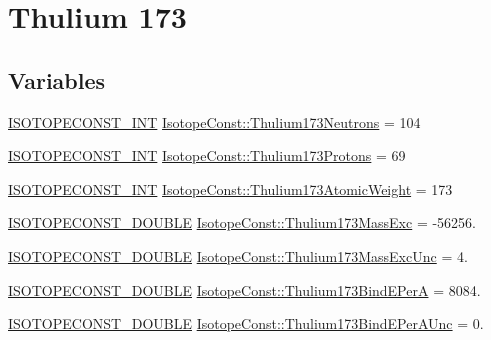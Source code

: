 \hypertarget{group___isotope_const-_thulium-_tm173}{}\section{Thulium 173}
\label{group___isotope_const-_thulium-_tm173}
\subsection*{Variables}
\begin{DoxyCompactItemize}
\item 
\mbox{\hyperlink{group___isotope_const-_macros_ga5f18360b3e99483a35c32d789e62621c}{I\+S\+O\+T\+O\+P\+E\+C\+O\+N\+S\+T\+\_\+\+I\+NT}} \mbox{\hyperlink{group___isotope_const-_thulium-_tm173_gaefd79f502e4828ecd6bbb4e08291b512}{Isotope\+Const\+::\+Thulium173\+Neutrons}} = 104
\item 
\mbox{\hyperlink{group___isotope_const-_macros_ga5f18360b3e99483a35c32d789e62621c}{I\+S\+O\+T\+O\+P\+E\+C\+O\+N\+S\+T\+\_\+\+I\+NT}} \mbox{\hyperlink{group___isotope_const-_thulium-_tm173_gab4f5866e05c2508376317e7c01800d8a}{Isotope\+Const\+::\+Thulium173\+Protons}} = 69
\item 
\mbox{\hyperlink{group___isotope_const-_macros_ga5f18360b3e99483a35c32d789e62621c}{I\+S\+O\+T\+O\+P\+E\+C\+O\+N\+S\+T\+\_\+\+I\+NT}} \mbox{\hyperlink{group___isotope_const-_thulium-_tm173_ga4da13be2ccf48c1957ec394f1b19045e}{Isotope\+Const\+::\+Thulium173\+Atomic\+Weight}} = 173
\item 
\mbox{\hyperlink{group___isotope_const-_macros_ga8f45a7272ce02c0b4c65c44636ed719a}{I\+S\+O\+T\+O\+P\+E\+C\+O\+N\+S\+T\+\_\+\+D\+O\+U\+B\+LE}} \mbox{\hyperlink{group___isotope_const-_thulium-_tm173_ga52a7ffa2b4cc8357243beb824a3330f1}{Isotope\+Const\+::\+Thulium173\+Mass\+Exc}} = -\/56256.
\item 
\mbox{\hyperlink{group___isotope_const-_macros_ga8f45a7272ce02c0b4c65c44636ed719a}{I\+S\+O\+T\+O\+P\+E\+C\+O\+N\+S\+T\+\_\+\+D\+O\+U\+B\+LE}} \mbox{\hyperlink{group___isotope_const-_thulium-_tm173_ga6409a4e2c141d36dd03c91b7ac477519}{Isotope\+Const\+::\+Thulium173\+Mass\+Exc\+Unc}} = 4.
\item 
\mbox{\hyperlink{group___isotope_const-_macros_ga8f45a7272ce02c0b4c65c44636ed719a}{I\+S\+O\+T\+O\+P\+E\+C\+O\+N\+S\+T\+\_\+\+D\+O\+U\+B\+LE}} \mbox{\hyperlink{group___isotope_const-_thulium-_tm173_gade1db67822764b8d4791d3ba14ef9d38}{Isotope\+Const\+::\+Thulium173\+Bind\+E\+PerA}} = 8084.
\item 
\mbox{\hyperlink{group___isotope_const-_macros_ga8f45a7272ce02c0b4c65c44636ed719a}{I\+S\+O\+T\+O\+P\+E\+C\+O\+N\+S\+T\+\_\+\+D\+O\+U\+B\+LE}} \mbox{\hyperlink{group___isotope_const-_thulium-_tm173_ga1c16d559df0ca8f7edbf860891de06ea}{Isotope\+Const\+::\+Thulium173\+Bind\+E\+Per\+A\+Unc}} = 0.

\end{DoxyCompactItemize}
